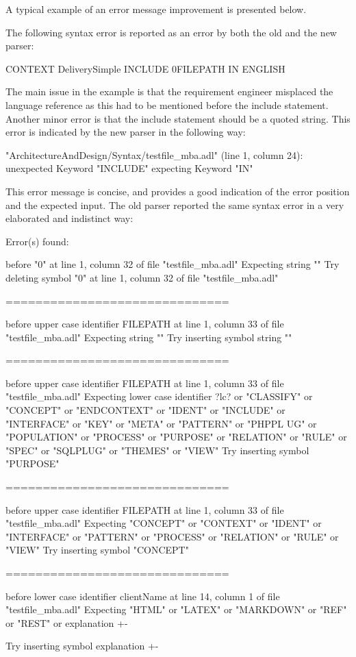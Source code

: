 A typical example of an error message improvement is presented below.

The following syntax error is reported as an error by both the old and the new parser:
\begin{adl}
   CONTEXT DeliverySimple INCLUDE 0FILEPATH IN ENGLISH
\end{adl}

The main issue in the example is that the requirement engineer misplaced the language reference as this had to be mentioned before the include statement.
Another minor error is that the include statement should be a quoted string.
This error is indicated by the new parser in the following way:
\begin{error}
   "ArchitectureAndDesign/Syntax/testfile_mba.adl" (line 1, column 24):
   unexpected Keyword "INCLUDE"
   expecting Keyword "IN"
\end{error}

This error message is concise, and provides a good indication of the error position and the expected input.
The old parser reported the same syntax error in a very elaborated and indistinct way:
\begin{error}
   Error(s) found:

   before "0" at line 1, column 32 of file "testfile_mba.adl"
   Expecting string ""
   Try deleting symbol "0" at line 1, column 32 of file "testfile_mba.adl"

   ==============================

   before upper case identifier FILEPATH at line 1, column 33 of file "testfile_mba.adl"
   Expecting string ""
   Try inserting symbol string ""

   ==============================

   before upper case identifier FILEPATH at line 1, column 33 of file "testfile_mba.adl"
   Expecting lower case identifier ?lc? or "CLASSIFY" or "CONCEPT" or "ENDCONTEXT" or "IDENT" or "INCLUDE" or "INTERFACE" or "KEY" or "META" or "PATTERN" or "PHPPL UG" or "POPULATION" or "PROCESS" or "PURPOSE" or "RELATION" or "RULE" or "SPEC" or "SQLPLUG" or "THEMES" or "VIEW"
   Try inserting symbol "PURPOSE"

   ==============================

   before upper case identifier FILEPATH at line 1, column 33 of file "testfile_mba.adl"
   Expecting "CONCEPT" or "CONTEXT" or "IDENT" or "INTERFACE" or "PATTERN" or "PROCESS" or "RELATION" or "RULE" or "VIEW"
   Try inserting symbol "CONCEPT"

   ==============================

   before lower case identifier clientName at line 14, column 1 of file "testfile_mba.adl"
   Expecting "HTML" or "LATEX" or "MARKDOWN" or "REF" or "REST" or explanation {+-}

   Try inserting symbol explanation {+-}
\end{error}

